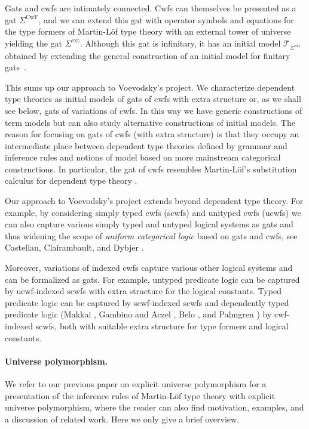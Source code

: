 \documentclass[11pt,a4paper]{article}
\theoremstyle{plain}
\theoremstyle{definition}
\newcommand{\T}{\mathsf{T}}
\def\T{\mathcal{T}}
\def\CwF{\mathrm{CwF}}
\def\Sigmaext{{\Sigma^\mathrm{ext}}}
\def\Sigmaint{{\Sigma^\mathrm{up}}}
\def\TText{{\mathbf{TT}_\mathrm{ext}}}
\def\TTint{{\mathbf{TT}_\mathrm{up}}}
\begin{document}
Gats and cwfs are intimately connected. Cwfs can themselves be presented as a gat $\Sigma^\CwF$, and we can extend this gat with operator symbols and equations for the type formers of Martin-Löf type theory with an external tower of universe yielding the gat $\Sigmaext$. Although this gat is infinitary, it has an initial model $\T_{\Sigmaext}$  obtained by extending the general construction of an initial model for finitary gats~\cite[Section 5.7]{bezem:hofmann}.

This sums up our approach to Voevodsky's project. We characterize dependent type theories as initial models of gats of cwfs with extra structure or, as we shall see below, gats of variations of cwfs. In this way we have generic constructions of term models but can also study alternative constructions of initial models. The reason for focusing on gats of cwfs (with extra structure) is that they occupy an intermediate place between dependent type theories defined by grammar and inference rules and notions of model based on more mainstream categorical constructions. In particular, the gat of cwfs resembles Martin-Löf's substitution calculus for dependent type theory \cite{martinlof:gbg92,tasistro:lic}.

Our approach to Voevodsky's project extends beyond dependent type theory. For example, by considering simply typed cwfs (scwfs) and unityped cwfs (ucwfs) we can also capture various simply typed and untyped logical systems as gats and thus widening the scope of {\em uniform categorical logic} based on gats and cwfs, see Castellan, Clairambault, and Dybjer \cite{castellan:lambek}.


Moreover, variations of indexed cwfs capture various other logical systems and can be formalized as gats. For example, untyped predicate logic can be captured by ucwf-indexed scwfs with extra structure for the logical constants. Typed predicate logic can be captured by scwf-indexed scwfs and dependently typed predicate logic (Makkai \cite{makkai:folds}, Gambino and Aczel \cite{gambino-aczel}, Belo \cite{belo}, and Palmgren \cite{Palmgren19}) by cwf-indexed scwfs, both with suitable extra structure for type formers and logical constants.

\paragraph{Universe polymorphism.} We refer to our previous paper on explicit universe polymorphism \cite{BezemCDE22} for a presentation of the inference rules of Martin-Löf type theory with explicit universe polymorphism, where the reader can also find motivation, examples, and a discussion of related work. Here we only give a brief overview.
\end{document}
